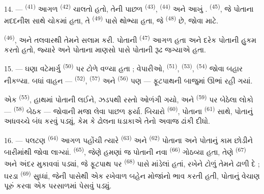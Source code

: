 \VUsaut{3.0mm}

14. ---  \textsuperscript{(41)} આગળ  \textsuperscript{(42)} ચાલતો હતો, તેની પાછળ 
\textsuperscript{(43)},  \textsuperscript{(44)} અને
આખું .  \textsuperscript{(45)}, જે પોતાના
મદદનીશ સાથે ચોકમાં હતા, તે  \textsuperscript{(49)}
પાસે થોભ્યા હતા, જે  \textsuperscript{(48)} છે,
 જોવા માટે.

 \textsuperscript{(46)},  અને
 તલવારથી તેમને સલામ કરી. 
પોતાની  \textsuperscript{(47)} આગળ હતા અને દરેક
 પોતાની  હુકમ કરતો હતો, જ્યારે
 અને  પોતાના
માણસો પાસે પોતાની રૂઢ જગ્યાએ હતા.

15. --- ઘણા વટેમાર્ગુ  \textsuperscript{(50)} પર
ટોળે વળ્યા હતા ; વેપારીઓ,  \textsuperscript{(51)},
 \textsuperscript{(53)}, 
\textsuperscript{(54)}  જોવા બહાર નીકળ્યા. બધાં
વાહન —  \textsuperscript{(52)},
 \textsuperscript{(57)} અને  \textsuperscript{(56)} પણ — ફૂટપાથની બાજુમાં ઊભાં રહી
ગયાં.

\VUsaut{3.0mm}

એક  \textsuperscript{(55)}, હાથમાં
પોતાની  લઈને, ઝડપથી રસ્તો ઓળંગી ગયો, અને
 \textsuperscript{(59)} પર બેઠેલા લોકો ---
 \textsuperscript{(58)} બેઠક --- જોવાની મજા લેવા
પાછળ ફર્યા.
બિચારો  \textsuperscript{(60)}, પોતાના  \textsuperscript{(61)} સાથે, પોતાનું 
અધવચ્ચે બંધ કરવું પડ્યું, કેમ કે ઢોલના ધડાકાએ તેનો અવાજ ઢાંકી દીધો.

16. --- પલટણ  \textsuperscript{(64)} આગળ પહોંચી
ત્યારે  \textsuperscript{(63)} અને
 \textsuperscript{(62)} પોતાના  અને પોતાનું
કામ છોડીને બારીમાંથી જોવા લાગ્યાં. 
\textsuperscript{(65)}, જેણે હમણાં જ પોતાની  નવા
 \textsuperscript{(66)} ગોઠવ્યા હતા, તેણે 
\textsuperscript{(67)} અને  અંદર મુકાવવાં પડ્યાં, જે
ફૂટપાથ પર  \textsuperscript{(68)} પાસે માંડેલાં
હતાં, રખેને ટોળું તેમને ઢાળી દે ; ઘરડા 
\textsuperscript{(69)} સુધ્ધાં, જેની પાસેથી એક રખેવાળ બહેન મોજાંનો ભાવ
કરતી હતી, પોતાનું વેચાણ પૂરું કરવા એક પરસાળમાં પેસવું પડ્યું.

